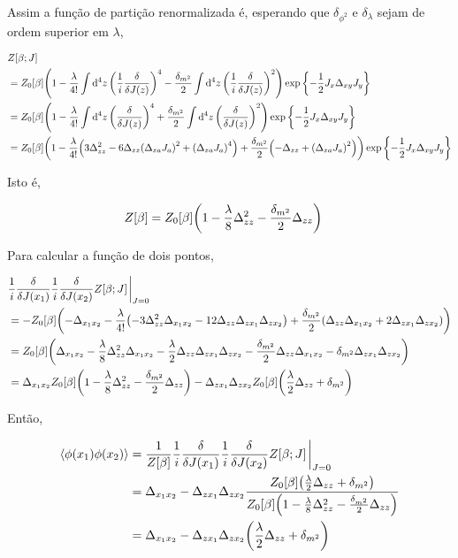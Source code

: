 \documentclass[twoside]{amsart}
\numberwithin{equation}{section}
\begin{document}
Assim a função de partição renormalizada é, esperando que $\delta_{\phi^2}$ e $\delta_{\lambda}$ sejam de ordem superior em $\lambda$,

\begin{align}
    &Z\qty[\beta; J]\\
    &=Z_0[\beta]\qty(1-\frac{\lambda}{4!}\int\dd[4]{z}\qty(\frac{1}{i}\fdv{}{J\qty(z)})^4-\frac{\delta_{m^2}}{2}\int\dd[4]{z}\qty(\frac1i\fdv{}{J\qty(z)})^2)\exp\qty{-\frac12J_x\Delta_{xy}J_y}\\
    &=Z_0[\beta]\qty(1-\frac{\lambda}{4!}\int\dd[4]{z}\qty(\fdv{}{J\qty(z)})^4+\frac{\delta_{m^2}}{2}\int\dd[4]{z}\qty(\fdv{}{J\qty(z)})^2)\exp\qty{-\frac12J_x\Delta_{xy}J_y}\\
    &=Z_0[\beta]\qty(1-\frac{\lambda}{4!}\qty(3\Delta^2_{zz}-6\Delta_{zz}\qty(\Delta_{za}J_a)^2+\qty(\Delta_{za}J_a)^4)+\frac{\delta_{m^2}}{2}\qty(-\Delta_{zz}+\qty(\Delta_{za}J_a)^2))\exp\qty{-\frac12J_x\Delta_{xy}J_y}
\end{align}

Isto é,

\begin{align}
    Z\qty[\beta]&=Z_0[\beta]\qty(1-\frac{\lambda}{8}\Delta^2_{zz}-\frac{\delta_{m^2}}{2}\Delta_{zz})  
\end{align}

Para calcular a função de dois pontos,

\begin{align}
    &\frac1i\fdv{}{J\qty(x_1)}\frac1i\fdv{}{J\qty(x_2)}Z\qty[\beta; J]\eval_{J=0}\\
    &=-Z_0[\beta]\qty(-\Delta_{x_1x_2}-\frac{\lambda}{4!}\qty(-3\Delta^2_{zz}\Delta_{x_1x_2}-12\Delta_{zz}\Delta_{zx_1}\Delta_{zx_2})+\frac{\delta_{m^2}}{2}\qty(\Delta_{zz}\Delta_{x_1x_2}+2\Delta_{zx_1}\Delta_{zx_2}))\\
    &=Z_0[\beta]\qty(\Delta_{x_1x_2}-\frac{\lambda}{8}\Delta^2_{zz}\Delta_{x_1x_2}-\frac{\lambda}{2}\Delta_{zz}\Delta_{zx_1}\Delta_{zx_2}-\frac{\delta_{m^2}}{2}\Delta_{zz}\Delta_{x_1x_2}-\delta_{m^2}\Delta_{zx_1}\Delta_{zx_2})\\
    &=\Delta_{x_1x_2}Z_0[\beta]\qty(1-\frac{\lambda}{8}\Delta^2_{zz}-\frac{\delta_{m^2}}{2}\Delta_{zz})-\Delta_{zx_1}\Delta_{zx_2}Z_0[\beta]\qty(\frac\lambda2\Delta_{zz}+\delta_{m^2})
\end{align}

Então,

\begin{align}
    \expval{\phi\qty(x_1)\phi\qty(x_2)}&=\frac{1}{Z\qty[\beta]}\frac1i\fdv{}{J\qty(x_1)}\frac1i\fdv{}{J\qty(x_2)}Z\qty[\beta; J]\eval_{J=0}\\
    &=\Delta_{x_1x_2}-\Delta_{zx_1}\Delta_{zx_2}\frac{Z_0[\beta]\qty(\frac\lambda2\Delta_{zz}+\delta_{m^2})}{Z_0[\beta]\qty(1-\frac{\lambda}{8}\Delta^2_{zz}-\frac{\delta_{m^2}}{2}\Delta_{zz})  }\\
    &=\Delta_{x_1x_2}-\Delta_{zx_1}\Delta_{zx_2}\qty(\frac\lambda2\Delta_{zz}+\delta_{m^2})
\end{align}
\end{document}
